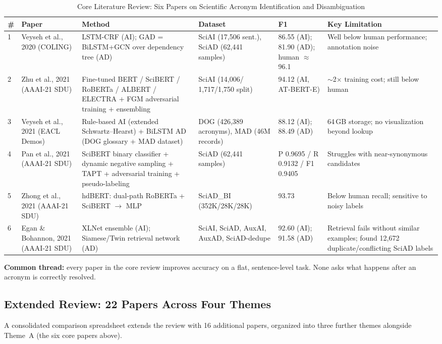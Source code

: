 \documentclass[10pt,conference]{IEEEtran}
\begin{document}
\begin{table}[t]
\caption{Core Literature Review: Six Papers on Scientific Acronym Identification and Disambiguation}
\label{tab:core_review}
\centering
\small
\begin{tabular}{@{}p{}p{}p{}p{}p{}p{}@{}}
\toprule
\textbf{\#} & \textbf{Paper} & \textbf{Method} & \textbf{Dataset} & \textbf{F1} & \textbf{Key Limitation} \\
\midrule
1 & Veyseh et al., 2020 (COLING) & LSTM-CRF (AI); GAD = BiLSTM+GCN over dependency tree (AD) & SciAI (17{,}506 sent.), SciAD (62{,}441 samples) & 86.55 (AI); 81.90 (AD); human $\approx$96.1 & Well below human performance; annotation noise \\
2 & Zhu et al., 2021 (AAAI-21 SDU) & Fine-tuned BERT / SciBERT / RoBERTa / ALBERT / ELECTRA + FGM adversarial training + ensembling & SciAI (14{,}006/ 1{,}717/1{,}750 split) & 94.12 (AI, AT-BERT-E) & $\sim$2$\times$ training cost; still below human \\
3 & Veyseh et al., 2021 (EACL Demos) & Rule-based AI (extended Schwartz--Hearst) + BiLSTM AD (DOG glossary + MAD dataset) & DOG (426{,}389 acronyms), MAD (46M records) & 88.12 (AI); 88.49 (AD) & 64\,GB storage; no visualization beyond lookup \\
4 & Pan et al., 2021 (AAAI-21 SDU) & SciBERT binary classifier + dynamic negative sampling + TAPT + adversarial training + pseudo-labeling & SciAD (62{,}441 samples) & P 0.9695 / R 0.9132 / F1 0.9405 & Struggles with near-synonymous candidates \\
5 & Zhong et al., 2021 (AAAI-21 SDU) & hdBERT: dual-path RoBERTa + SciBERT $\rightarrow$ MLP & SciAD\_BI (352K/28K/28K) & 93.73 & Below human recall; sensitive to noisy labels \\
6 & Egan \& Bohannon, 2021 (AAAI-21 SDU) & XLNet ensemble (AI); Siamese/Twin retrieval network (AD) & SciAI, SciAD, AuxAI, AuxAD, SciAD-dedupe & 92.60 (AI); 91.58 (AD) & Retrieval fails without similar examples; found 12{,}672 duplicate/conflicting SciAD labels \\
\bottomrule
\end{tabular}
\end{table}

\textbf{Common thread:} every paper in the core review improves accuracy on a flat, sentence-level task. None asks what happens after an acronym is correctly resolved.

\subsection{Extended Review: 22 Papers Across Four Themes}
A consolidated comparison spreadsheet extends the review with 16 additional papers, organized into three further themes alongside Theme~A (the six core papers above).
\end{document}
